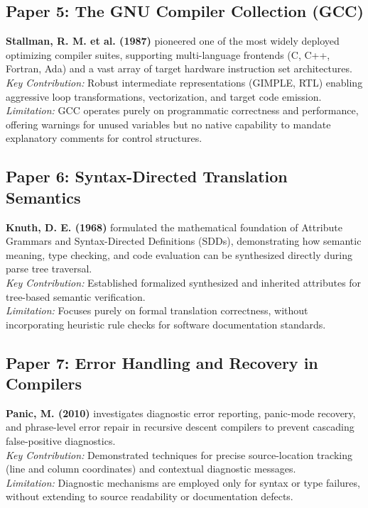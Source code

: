 \subsection{Paper 5: The GNU Compiler Collection (GCC)}
\textbf{Stallman, R. M. et al. (1987)} \cite{stallman1987gcc} pioneered one of the most widely deployed optimizing compiler suites, supporting multi-language frontends (C, C++, Fortran, Ada) and a vast array of target hardware instruction set architectures. \\
\textit{Key Contribution:} Robust intermediate representations (GIMPLE, RTL) enabling aggressive loop transformations, vectorization, and target code emission. \\
\textit{Limitation:} GCC operates purely on programmatic correctness and performance, offering warnings for unused variables but no native capability to mandate explanatory comments for control structures.

\subsection{Paper 6: Syntax-Directed Translation Semantics}
\textbf{Knuth, D. E. (1968)} \cite{knuth1968semantics} formulated the mathematical foundation of Attribute Grammars and Syntax-Directed Definitions (SDDs), demonstrating how semantic meaning, type checking, and code evaluation can be synthesized directly during parse tree traversal. \\
\textit{Key Contribution:} Established formalized synthesized and inherited attributes for tree-based semantic verification. \\
\textit{Limitation:} Focuses purely on formal translation correctness, without incorporating heuristic rule checks for software documentation standards.

\subsection{Paper 7: Error Handling and Recovery in Compilers}
\textbf{Panic, M. (2010)} \cite{panic2010error} investigates diagnostic error reporting, panic-mode recovery, and phrase-level error repair in recursive descent compilers to prevent cascading false-positive diagnostics. \\
\textit{Key Contribution:} Demonstrated techniques for precise source-location tracking (line and column coordinates) and contextual diagnostic messages. \\
\textit{Limitation:} Diagnostic mechanisms are employed only for syntax or type failures, without extending to source readability or documentation defects.

